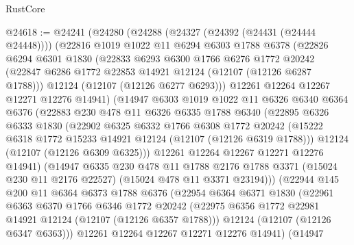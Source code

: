 \begin{lexlean}{RustCore}
\begin{coremodule}
@24618 := @24241
    (@24280
      (@24288
        (@24327 (@24392 (@24431 (@24444 @24448))))
        (@22816
          @1019
          @1022
          @11
          @6294
          @6303
          @1788
          @6378
          (@22826
            @6294
            @6301
            @1830
            (@22833
              @6293
              @6300
              @1766
              @6276
              @1772
              @20242
              (@22847 @6286 @1772 @22853 @14921 @12124 (@12107 (@12126 @6287 @1788)))
              @12124
              (@12107 (@12126 @6277 @6293)))
            @12261
            @12264
            @12267
            @12271
            @12276
            @14941)
          (@14947
            @6303
            @1019
            @1022
            @11
            @6326
            @6340
            @6364
            @6376
            (@22883
              @230
              @478
              @11
              @6326
              @6335
              @1788
              @6340
              (@22895
                @6326
                @6333
                @1830
                (@22902
                  @6325
                  @6332
                  @1766
                  @6308
                  @1772
                  @20242
                  (@15222 @6318 @1772 @15233 @14921 @12124 (@12107 (@12126 @6319 @1788)))
                  @12124
                  (@12107 (@12126 @6309 @6325)))
                @12261
                @12264
                @12267
                @12271
                @12276
                @14941)
              (@14947
                @6335
                @230
                @478
                @11
                @1788
                @2176
                @1788
                @3371
                (@15024 @230 @11 @2176 @22527)
                (@15024 @478 @11 @3371 @23194)))
            (@22944
              @145
              @200
              @11
              @6364
              @6373
              @1788
              @6376
              (@22954
                @6364
                @6371
                @1830
                (@22961
                  @6363
                  @6370
                  @1766
                  @6346
                  @1772
                  @20242
                  (@22975 @6356 @1772 @22981 @14921 @12124 (@12107 (@12126 @6357 @1788)))
                  @12124
                  (@12107 (@12126 @6347 @6363)))
                @12261
                @12264
                @12267
                @12271
                @12276
                @14941)
              (@14947

\end{coremodule}
\end{lexlean}
